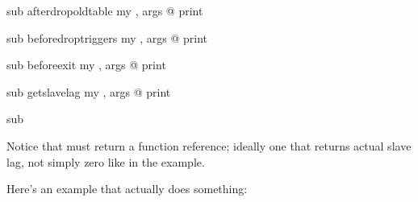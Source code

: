 \documentclass[letterpaper,10pt,english]{sphinxmanual}
\begin{document}
\begin{sphinxVerbatim}[commandchars=\\\{\}]
 sub after\PYGZus{}drop\PYGZus{}old\PYGZus{}table 
    my , \PYGZpc{}args  @\PYGZus{}
    print 

 sub before\PYGZus{}drop\PYGZus{}triggers 
    my , \PYGZpc{}args  @\PYGZus{}
    print 

 sub before\PYGZus{}exit 
    my , \PYGZpc{}args  @\PYGZus{}
    print 

 sub get\PYGZus{}slave\PYGZus{}lag 
    my , \PYGZpc{}args  @\PYGZus{}
    print 

     sub    

\end{sphinxVerbatim}

Notice that  must return a function reference;
ideally one that returns actual slave lag, not simply zero like in the example.

Here’s an example that actually does something:
\end{document}

